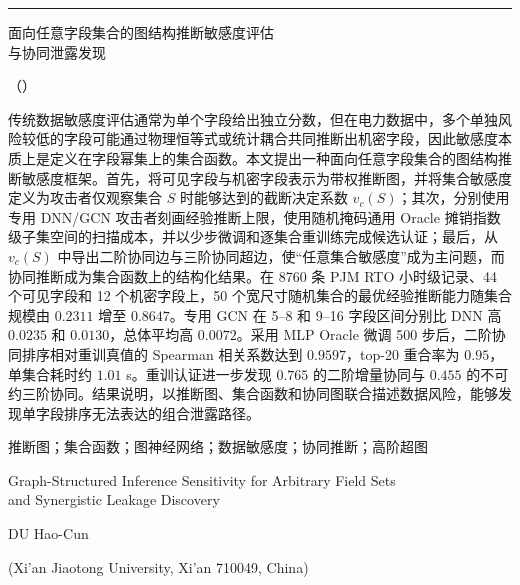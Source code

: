 \thispagestyle{empty}
\vspace*{-9mm}
\par
\vspace{1mm}
\noindent\rule{\textwidth}{0.8pt}

\begin{center}
\vspace{7mm}
{\heiti 面向任意字段集合的图结构推断敏感度评估\\[1mm]
与协同泄露发现\par}
\vspace{4mm}
{\fangsong \StudentName\par}
\vspace{2mm}
{\songti（\Affiliation）\par}
\end{center}

\vspace{4mm}
{\setlength{\baselineskip}{16pt}\selectfont
{}
传统数据敏感度评估通常为单个字段给出独立分数，但在电力数据中，多个单独风险较低的字段可能通过物理恒等式或统计耦合共同推断出机密字段，因此敏感度本质上是定义在字段幂集上的集合函数。本文提出一种面向任意字段集合的图结构推断敏感度框架。首先，将可见字段与机密字段表示为带权推断图，并将集合敏感度定义为攻击者仅观察集合 $S$ 时能够达到的截断决定系数 $v_c(S)$；其次，分别使用专用 DNN/GCN 攻击者刻画经验推断上限，使用随机掩码通用 Oracle 摊销指数级子集空间的扫描成本，并以少步微调和逐集合重训练完成候选认证；最后，从 $v_c(S)$ 中导出二阶协同边与三阶协同超边，使“任意集合敏感度”成为主问题，而协同推断成为集合函数上的结构化结果。在 8760 条 PJM RTO 小时级记录、44 个可见字段和 12 个机密字段上，50 个宽尺寸随机集合的最优经验推断能力随集合规模由 $0.2311$ 增至 $0.8647$。专用 GCN 在 5--8 和 9--16 字段区间分别比 DNN 高 $0.0235$ 和 $0.0130$，总体平均高 $0.0072$。采用 MLP Oracle 微调 500 步后，二阶协同排序相对重训真值的 Spearman 相关系数达到 $0.9597$，top-20 重合率为 $0.95$，单集合耗时约 $1.01$ s。重训认证进一步发现 $0.765$ 的二阶增量协同与 $0.455$ 的不可约三阶协同。结果说明，以推断图、集合函数和协同图联合描述数据风险，能够发现单字段排序无法表达的组合泄露路径。\par}

\vspace{2mm}
{推断图；集合函数；图神经网络；数据敏感度；协同推断；高阶超图}

\begin{center}
\vspace{6mm}
{\heiti Graph-Structured Inference Sensitivity for Arbitrary Field Sets\\[-0.5mm]
and Synergistic Leakage Discovery\par}
\vspace{3mm}
{DU Hao-Cun\par}
\vspace{1mm}
{(Xi'an Jiaotong University, Xi'an 710049, China)\par}
\end{center}

